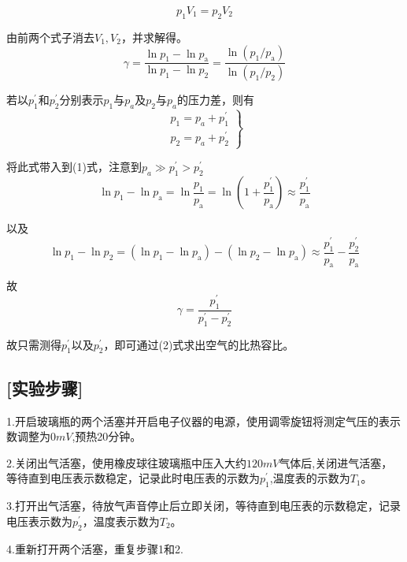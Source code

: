 \documentclass[UTF8]{article}
\begin{document}
	\[ p_1V_1=p_2V_2\]
	\par 由前两个式子消去$V_1,V_2$，并求解得。
	\begin{equation}
		\gamma=\frac{\ln p_1-\ln p_{\mathrm{a}}}{\ln p_1-\ln p_2}=\frac{\ln \left(p_1 / p_{\mathrm{a}}\right)}{\ln \left(p_1 / p_2\right)}
	\end{equation}
	\par 若以$p_1^{\prime}$和$p_2^{\prime}$分别表示$p_1$与$p_a$及$p_2$与$p_a$的压力差，则有
	\begin{equation*}
	\left.\begin{array}{l}
		p_1=p_a+p_1^{\prime} \\
		p_2=p_a+p_2^{\prime}
	\end{array}\right\}
	\end{equation*}
	\par 将此式带入到(1)式，注意到$p_a\gg p_1^{\prime}>p_2^{\prime}$
	\begin{equation*}
		\ln p_1-\ln p_{\mathrm{a}}=\ln \frac{p_1}{p_{\mathrm{a}}}=\ln \left(1+\frac{p_1^{\prime}}{p_{\mathrm{a}}}\right) \approx \frac{p_1^{\prime}}{p_{\mathrm{a}}}
	\end{equation*}
	\par 以及
	\begin{equation*}
		\ln p_1-\ln p_2=\left(\ln p_1-\ln p_{\mathrm{a}}\right)-\left(\ln p_2-\ln p_{\mathrm{a}}\right)\approx \frac{p_1^{\prime}}{p_{\mathrm{a}}}-\frac{p_2^{\prime}}{p_{\mathrm{a}}}
	\end{equation*}
	\par 故
	\begin{equation}
		\gamma=\frac{p_1^{\prime}}{p_1^{\prime}-p_2^{\prime}}
	\end{equation}
	\par 故只需测得$p_1^{\prime}$以及$p_2^{\prime}$，即可通过(2)式求出空气的比热容比。
	\subsection*{[实验步骤]}
	\par 1.开启玻璃瓶的两个活塞并开启电子仪器的电源，使用调零旋钮将测定气压的表示数调整为$0mV$,预热20分钟。
	\par 2.关闭出气活塞，使用橡皮球往玻璃瓶中压入大约$120mV$气体后,关闭进气活塞，等待直到电压表示数稳定，记录此时电压表的示数为$p^{\prime}_1$,温度表的示数为$T_1$。
	\par 3.打开出气活塞，待放气声音停止后立即关闭，等待直到电压表的示数稳定，记录电压表示数为$p^{\prime}_2$，温度表示数为$T_2$。
	\par 4.重新打开两个活塞，重复步骤1和2.
\end{document}
